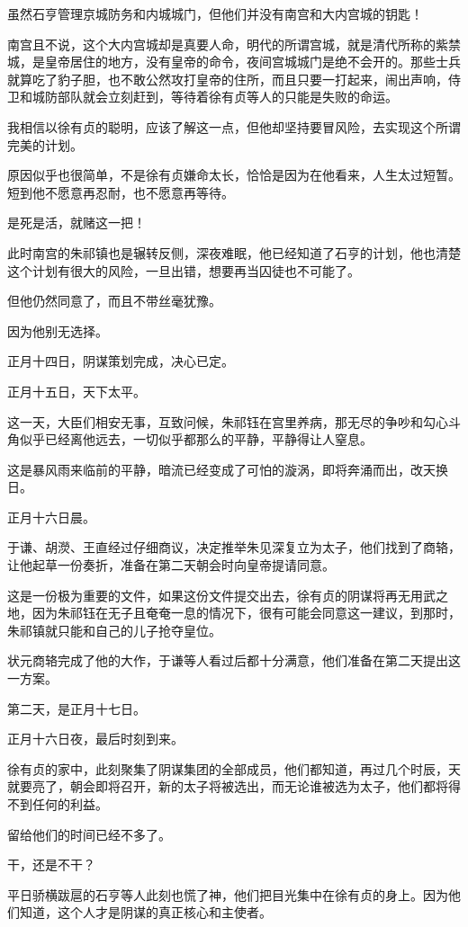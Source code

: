 \begin{multicols}{\theparacolNo}
虽然石亨管理京城防务和内城城门，但他们并没有南宫和大内宫城的钥匙！

南宫且不说，这个大内宫城却是真要人命，明代的所谓宫城，就是清代所称的紫禁城，是皇帝居住的地方，没有皇帝的命令，夜间宫城城门是绝不会开的。那些士兵就算吃了豹子胆，也不敢公然攻打皇帝的住所，而且只要一打起来，闹出声响，侍卫和城防部队就会立刻赶到，等待着徐有贞等人的只能是失败的命运。

我相信以徐有贞的聪明，应该了解这一点，但他却坚持要冒风险，去实现这个所谓完美的计划。

原因似乎也很简单，不是徐有贞嫌命太长，恰恰是因为在他看来，人生太过短暂。短到他不愿意再忍耐，也不愿意再等待。

是死是活，就赌这一把！

此时南宫的朱祁镇也是辗转反侧，深夜难眠，他已经知道了石亨的计划，他也清楚这个计划有很大的风险，一旦出错，想要再当囚徒也不可能了。

但他仍然同意了，而且不带丝毫犹豫。

因为他别无选择。

正月十四日，阴谋策划完成，决心已定。

正月十五日，天下太平。

这一天，大臣们相安无事，互致问候，朱祁钰在宫里养病，那无尽的争吵和勾心斗角似乎已经离他远去，一切似乎都那么的平静，平静得让人窒息。

这是暴风雨来临前的平静，暗流已经变成了可怕的漩涡，即将奔涌而出，改天换日。

正月十六日晨。

于谦、胡濙、王直经过仔细商议，决定推举朱见深复立为太子，他们找到了商辂，让他起草一份奏折，准备在第二天朝会时向皇帝提请同意。

这是一份极为重要的文件，如果这份文件提交出去，徐有贞的阴谋将再无用武之地，因为朱祁钰在无子且奄奄一息的情况下，很有可能会同意这一建议，到那时，朱祁镇就只能和自己的儿子抢夺皇位。

状元商辂完成了他的大作，于谦等人看过后都十分满意，他们准备在第二天提出这一方案。

第二天，是正月十七日。

正月十六日夜，最后时刻到来。

徐有贞的家中，此刻聚集了阴谋集团的全部成员，他们都知道，再过几个时辰，天就要亮了，朝会即将召开，新的太子将被选出，而无论谁被选为太子，他们都将得不到任何的利益。

留给他们的时间已经不多了。

干，还是不干？

平日骄横跋扈的石亨等人此刻也慌了神，他们把目光集中在徐有贞的身上。因为他们知道，这个人才是阴谋的真正核心和主使者。


\end{multicols}
